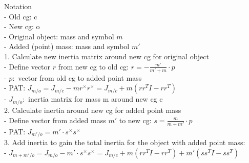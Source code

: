 Notation \\
	- Old cg: c \\
	- New cg: o \\
	- Original object: mass and symbol $m$ \\
	- Added (point) mass: mass and symbol $m'$ \\
1. Calculate new inertia matrix around new cg for original object \\
	- Define vector $r$ from new cg to old cg: $r = - \frac{m'}{m' + m} \cdot p$ \\
		- $p:$ vector from old cg to added point mass \\
	- PAT: $J_{m/o} = J_{m/c}-mr^{\times}r^{\times} = J_{m/c}+ m(rr^TI-rr^T)$  \\
		- $J_{m/o}:$ inertia matrix for mass m around new cg c \\
2. Calculate inertia around new cg for added point mass \\
	- Define vector from added mass $m'$ to new cg: $s = \frac{m}{m+m'} \cdot p$ \\
	- PAT: $J_{m'/o} =m'\cdot s^{\times} s^{\times}$ \\
3. Add inertia to gain the total inertia for the object with added point mass: \\
	- $J_{m+m'/o}=J_{m/o}-m'\cdot s^{\times} s^{\times}= J_{m/c}+ m(rr^TI-rr^T) + m'(ss^TI-ss^T)$ \\